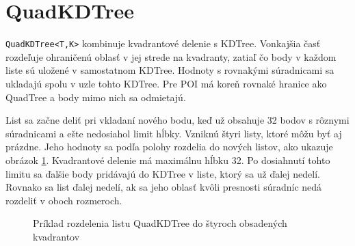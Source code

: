 \documentclass[12pt,a4paper,oneside]{report}
\begin{document}
\section{QuadKDTree}
\texttt{QuadKDTree<T,K>} kombinuje kvadrantové delenie s KDTree.
Vonkajšia časť rozdeľuje ohraničenú oblasť v jej strede na kvadranty,
zatiaľ čo body v každom liste sú uložené v samostatnom KDTree. Hodnoty
s rovnakými súradnicami sa ukladajú spolu v uzle tohto KDTree. Pre POI
má koreň rovnaké hranice ako QuadTree a body mimo nich sa odmietajú.

List sa začne deliť pri vkladaní nového bodu, keď už obsahuje 32 bodov
s rôznymi súradnicami a ešte nedosiahol limit hĺbky. Vzniknú štyri
listy, ktoré môžu byť aj prázdne. Jeho hodnoty sa podľa polohy
rozdelia do nových listov, ako ukazuje obrázok
\ref{fig:quadkd-split}. Kvadrantové delenie má maximálnu hĺbku 32.
Po dosiahnutí tohto limitu sa ďalšie body pridávajú do KDTree v liste,
ktorý sa už ďalej nedelí. Rovnako sa list ďalej nedelí, ak sa jeho
oblasť kvôli presnosti súradníc nedá rozdeliť v oboch rozmeroch.

\begin{figure}[H]
\centering
{}
\caption{Príklad rozdelenia listu QuadKDTree do štyroch obsadených kvadrantov}
\label{fig:quadkd-split}
\end{figure}
\end{document}
